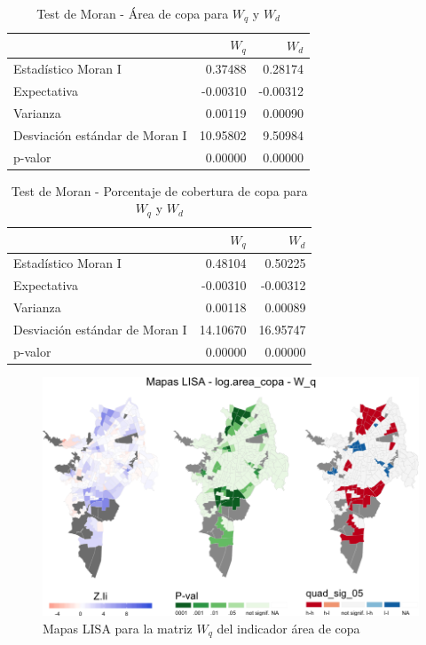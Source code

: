 \documentclass[12pt,a4paper,openany]{book}
\theoremstyle{definition}
\theoremstyle{definition}
\theoremstyle{definition}
\theoremstyle{remark}
\begin{document}
\begin{table}[H]

\caption{\label{tab:moran-copa-w}Test de Moran - Área de copa para $W_q$ y $W_d$}
\centering
\begin{tabular}{lrr}
\toprule
  & $W_q$ & $W_d$\\
\midrule
Estadístico Moran I & 0.37488 & 0.28174\\
Expectativa & -0.00310 & -0.00312\\
Varianza & 0.00119 & 0.00090\\
Desviación estándar de Moran I & 10.95802 & 9.50984\\
p-valor & 0.00000 & 0.00000\\
\bottomrule
\end{tabular}
\end{table}

\begin{table}[H]

\caption{\label{tab:moran-copaap-w}Test de Moran - Porcentaje de cobertura de copa para $W_q$ y $W_d$}
\centering
\begin{tabular}{lrr}
\toprule
  & $W_q$ & $W_d$\\
\midrule
Estadístico Moran I & 0.48104 & 0.50225\\
Expectativa & -0.00310 & -0.00312\\
Varianza & 0.00118 & 0.00089\\
Desviación estándar de Moran I & 14.10670 & 16.95747\\
p-valor & 0.00000 & 0.00000\\
\bottomrule
\end{tabular}
\end{table}

\begin{figure}[H]

{\centering \includegraphics[width=1\linewidth]{tesis-unigis_files/figure-latex/mapas-lisa-copa-wq-1} 

}

\caption{Mapas LISA para la matriz $W_q$ del indicador área de copa}\label{fig:mapas-lisa-copa-wq}
\end{figure}
\end{document}
